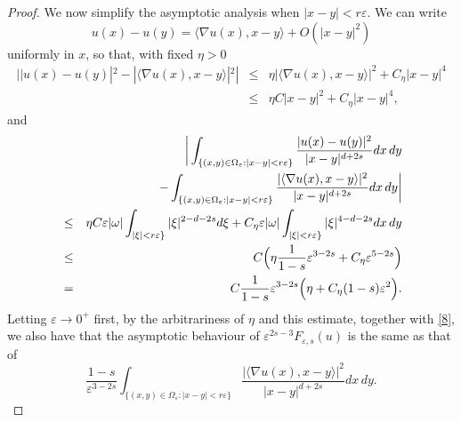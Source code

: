 \documentclass[10pt,a4paper]{amsart}
\newcommand{\e}{\varepsilon}
\begin{document}
\begin{proof}
We now simplify the asymptotic analysis when $|x-y|<r\e$. We can write
$$
u(x)-u(y)= \langle \nabla u(x), x-y\rangle + O(|x-y|^2)
$$
uniformly in $x$, so that, with fixed $\eta>0$
\begin{eqnarray*}
||u(x)-u(y)|^2- |\langle \nabla u(x), x-y\rangle|^2|&\le& \eta|\langle \nabla u(x), x-y\rangle|^2 +C_\eta |x-y|^4\\
&\le& \eta C|x-y|^2 +C_\eta |x-y|^4,
\end{eqnarray*}
and
\begin{eqnarray}\label{a2}\nonumber
&&\hskip-1.5cm\bigg|\int_{\{(x,y)\in\Omega_\e: |x-y|<r\e\}}\frac{|u(x)-u(y)|^2}{|x-y|^{d+2s}} dx\,dy
\\ \nonumber
&& -\int_{\{(x,y)\in\Omega_\e: |x-y|<r\e\}}\frac{|\langle \nabla u(x), x-y\rangle|^2}{|x-y|^{d+2s}} dx\,dy\bigg|\\ \nonumber
&\le&  \eta C\e|\omega|\int_{|\xi|<r\e\}}{|\xi|^{2-d-2s}} d\xi+C_\eta \e|\omega|\int_{|\xi|<r\e\}}{|\xi|^{4-d-2s}} dx\,dy\\\nonumber
&\le&  C\Big( \eta \frac{1}{1-s}\e^{3-2s}+C_\eta \e^{5-2s}\Big)\\
&=&  C\frac{1}{1-s}\e^{3-2s}\Big(  \eta+ C_\eta (1-s)\e^2\Big).
\end{eqnarray}
Letting $\e\to 0^+$  first, by the arbitrariness of $\eta$ and this estimate, together with \eqref{8}, we also have that the asymptotic behaviour of ${\e^{2s-3}}F_{\e,s}(u)$ is the same as that
of
$$
\frac{1-s}{\e^{3-2s}} \int_{\{(x,y)\in\Omega_\e: |x-y|<r\e\}}\frac{|\langle \nabla u(x), x-y\rangle|^2}{|x-y|^{d+2s}} dx\,dy.
$$


\end{proof}
\end{document}
